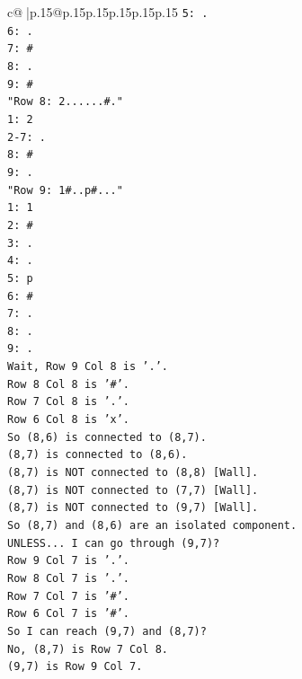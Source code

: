 \documentclass{article}
\begin{document}
{\begin{supertabular}{c@{$\;$}|p{.15\linewidth}@{}p{.15\linewidth}p{.15\linewidth}p{.15\linewidth}p{.15\linewidth}p{.15\linewidth}}
{{{\texttt{5: .} \\
\texttt{6: .} \\
\texttt{7: \#} \\
\texttt{8: .} \\
\texttt{9: \#} \\
\texttt{"Row 8: 2......\#."} \\
\texttt{1: 2} \\
\texttt{2{-}7: .} \\
\texttt{8: \#} \\
\texttt{9: .} \\
\texttt{"Row 9: 1\#..p\#..."} \\
\texttt{1: 1} \\
\texttt{2: \#} \\
\texttt{3: .} \\
\texttt{4: .} \\
\texttt{5: p} \\
\texttt{6: \#} \\
\texttt{7: .} \\
\texttt{8: .} \\
\texttt{9: .} \\
\texttt{Wait, Row 9 Col 8 is '.'.} \\
\texttt{Row 8 Col 8 is '\#'.} \\
\texttt{Row 7 Col 8 is '.'.} \\
\texttt{Row 6 Col 8 is 'x'.} \\
\texttt{So (8,6) is connected to (8,7).} \\
\texttt{(8,7) is connected to (8,6).} \\
\texttt{(8,7) is NOT connected to (8,8) {[}Wall{]}.} \\
\texttt{(8,7) is NOT connected to (7,7) {[}Wall{]}.} \\
\texttt{(8,7) is NOT connected to (9,7) {[}Wall{]}.} \\
\texttt{So (8,7) and (8,6) are an isolated component.} \\
\texttt{UNLESS... I can go through (9,7)?} \\
\texttt{Row 9 Col 7 is '.'.} \\
\texttt{Row 8 Col 7 is '.'.} \\
\texttt{Row 7 Col 7 is '\#'.} \\
\texttt{Row 6 Col 7 is '\#'.} \\
\texttt{So I can reach (9,7) and (8,7)?} \\
\texttt{No, (8,7) is Row 7 Col 8.} \\
\texttt{(9,7) is Row 9 Col 7.} \\
}}}
\end{supertabular}}
\end{document}
